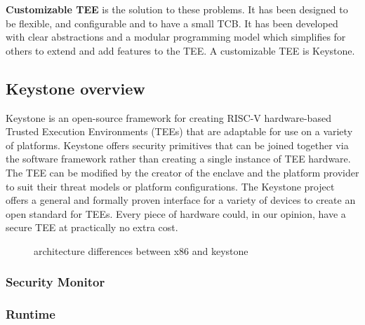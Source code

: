 \textbf{Customizable TEE} is the solution to these problems. It has been designed to be flexible, and configurable and to have a small TCB. It has been developed with clear abstractions and a modular programming model which simplifies for others to extend and add features to the TEE. A customizable TEE is Keystone.
\cite{lee2020keystone} 
\subsection{Keystone overview}
Keystone \cite{lee2020keystone} is an open-source framework for creating RISC-V hardware-based Trusted Execution Environments (TEEs) that are adaptable for use on a variety of platforms. Keystone offers security primitives that can be joined together via the software framework rather than creating a single instance of TEE hardware. The TEE can be modified by the creator of the enclave and the platform provider to suit their threat models or platform configurations. The Keystone project offers a general and formally proven interface for a variety of devices to create an open standard for TEEs. Every piece of hardware could, in our opinion, have a secure TEE at practically no extra cost.

\begin{figure}[h!]
    \centering
    
    \caption{architecture differences between x86 and keystone}
    \label{keystone-vs-x86}
\end{figure}
\subsubsection{Security Monitor}
\subsubsection{Runtime}
